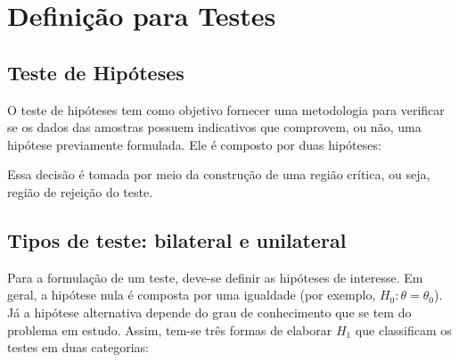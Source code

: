 \documentclass[
]{estat/estat}
\begin{document}
\hypertarget{definiuxe7uxe3o-para-testes}{%
\section{Definição para Testes}\label{definiuxe7uxe3o-para-testes}}

\hypertarget{teste-de-hipuxf3teses}{%
\subsection{Teste de Hipóteses}\label{teste-de-hipuxf3teses}}

O teste de hipóteses tem como objetivo fornecer uma metodologia para
verificar se os dados das amostras possuem indicativos que comprovem, ou
não, uma hipótese previamente formulada. Ele é composto por duas
hipóteses:


Essa decisão é tomada por meio da construção de uma região crítica, ou
seja, região de rejeição do teste.

\hypertarget{tipos-de-teste-bilateral-e-unilateral}{%
\subsection{Tipos de teste: bilateral e
unilateral}\label{tipos-de-teste-bilateral-e-unilateral}}

Para a formulação de um teste, deve-se definir as hipóteses de
interesse. Em geral, a hipótese nula é composta por uma igualdade (por
exemplo, \(H_{0}: \theta = \theta_{0}\)). Já a hipótese alternativa
depende do grau de conhecimento que se tem do problema em estudo. Assim,
tem-se três formas de elaborar \(H_{1}\) que classificam os testes em
duas categorias:
\end{document}
